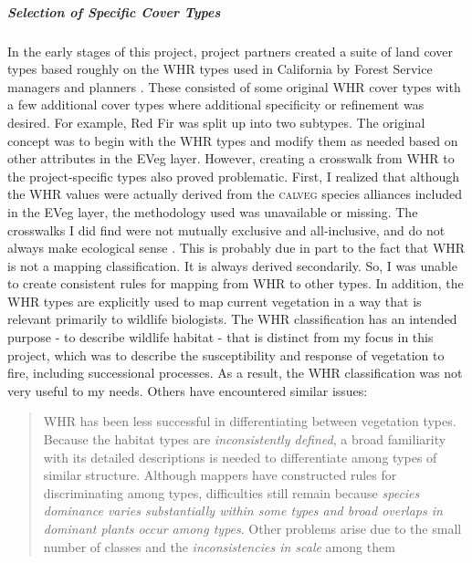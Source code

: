 \subparagraph*{Selection of Specific Cover Types}
In the early stages of this project, project partners created a suite of land cover types based roughly on the WHR types used in California by Forest Service managers and planners \citep{WHR1988}. These consisted of some original WHR cover types with a few additional cover types where additional specificity or refinement was desired. For example, Red Fir was split up into two subtypes. The original concept was to begin with the WHR types and modify them as needed based on other attributes in the EVeg layer. However, creating a crosswalk from WHR to the project-specific types also proved problematic. First, I realized that although the WHR values were actually derived from the \textsc{calveg} species alliances included in the EVeg layer, the methodology used was unavailable or missing. The crosswalks I did find were not mutually exclusive and all-inclusive, and do not always make ecological sense \citep{Keeler-Wolf2007,DeBecker1988,Game2005}. This is probably due in part to the fact that WHR is not a mapping classification. It is always derived secondarily. So, I was unable to create consistent rules for mapping from WHR to other types. In addition, the WHR types are explicitly used to map current vegetation in a way that is relevant primarily to wildlife biologists. The WHR classification has an intended purpose - to describe wildlife habitat - that is distinct from my focus in this project, which was to describe the susceptibility and response of vegetation to fire, including successional processes. As a result, the WHR classification was not very useful to my needs. Others have encountered similar issues:
%
\begin{quote}
WHR has been less successful in differentiating between vegetation types. Because the habitat types are \emph{inconsistently defined}, a broad familiarity with its detailed descriptions is needed to differentiate among types of similar structure. Although mappers have constructed rules for discriminating among types, difficulties still remain because \emph{species dominance varies substantially within some types and broad overlaps in dominant plants occur among types}. Other problems arise due to the small number of classes and the \emph{inconsistencies in scale} among them \citep[23, emphasis added]{Keeler-Wolf2007}
\end{quote}

